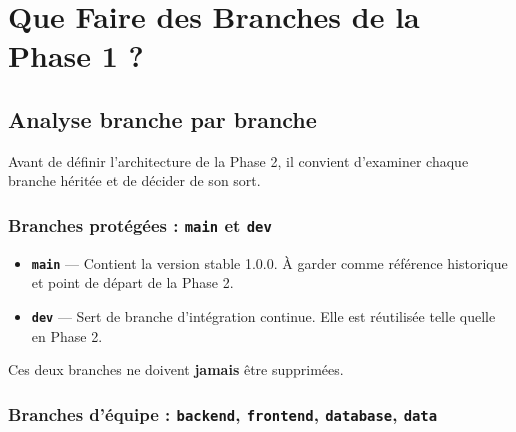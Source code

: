 \documentclass[11pt,a4paper]{article}
\begin{document}
\clearpage

\section{Que Faire des Branches de la Phase 1 ?}
\label{sec:decision}

\subsection{Analyse branche par branche}

Avant de définir l'architecture de la Phase 2, il convient d'examiner chaque branche héritée et de décider de son sort.

\vspace{0.5cm}

\subsubsection{Branches protégées : \texttt{main} et \texttt{dev}}

\begin{astuce}
\begin{itemize}
    \item \textbf{\texttt{main}} — Contient la version stable 1.0.0. À garder comme référence historique et point de départ de la Phase 2.
    \item \textbf{\texttt{dev}} — Sert de branche d'intégration continue. Elle est réutilisée telle quelle en Phase 2.
\end{itemize}
Ces deux branches ne doivent \textbf{jamais} être supprimées.
\end{astuce}

\subsubsection{Branches d'équipe : \texttt{backend}, \texttt{frontend}, \texttt{database}, \texttt{data}}
\end{document}
